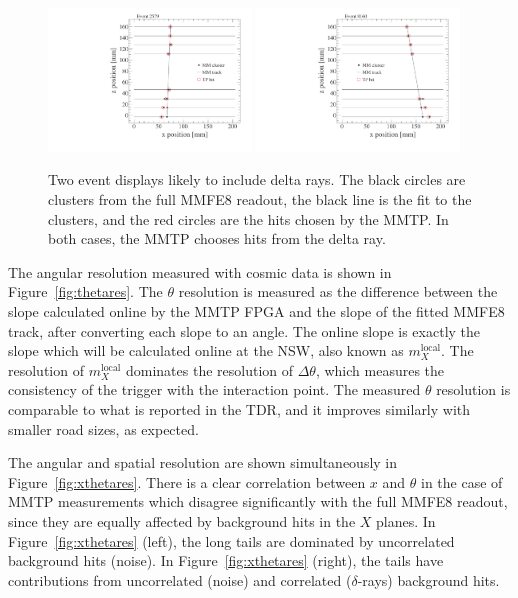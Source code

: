 \begin{figure}[!htpb]
  \begin{center}
    \includegraphics[width=0.48\textwidth]{figures/event_displays/display_02579.pdf}
    \includegraphics[width=0.48\textwidth]{figures/event_displays/display_08160.pdf}
  \end{center}
  \vspace{-10pt}
  \caption{Two event displays likely to include delta rays. The black circles are clusters from the full MMFE8 readout, the black line is the fit to the clusters, and the red circles are the hits chosen by the MMTP. In both cases, the MMTP chooses hits from the delta ray.}
  \label{fig:deltarays}
\end{figure}

The angular resolution measured with cosmic data is shown in Figure~\ref{fig:thetares}. The $\theta$ resolution is measured as the difference between the slope calculated online by the MMTP FPGA and the slope of the fitted MMFE8 track, after converting each slope to an angle. The online slope is exactly the slope which will be calculated online at the NSW, also known as $m_X^\text{local}$. The resolution of $m_X^\text{local}$ dominates the resolution of $\Delta\theta$, which measures the consistency of the trigger with the interaction point. The measured $\theta$ resolution is comparable to what is reported in the TDR, and it improves similarly with smaller road sizes, as expected.

The angular and spatial resolution are shown simultaneously in Figure~\ref{fig:xthetares}. There is a clear correlation between $x$ and $\theta$ in the case of MMTP measurements which disagree significantly with the full MMFE8 readout, since they are equally affected by background hits in the $X$ planes. In Figure~\ref{fig:xthetares} (left), the long tails are dominated by uncorrelated background hits (noise). In Figure~\ref{fig:xthetares} (right), the tails have contributions from uncorrelated (noise) and correlated ($\delta$-rays) background hits.

